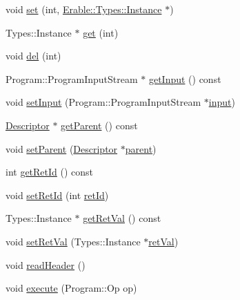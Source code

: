 \begin{DoxyCompactItemize}
void \mbox{\hyperlink{class_erable_1_1_descriptor_ab276c219050350ff23bfaab7ba2a884c}{set}} (int, \mbox{\hyperlink{class_erable_1_1_erable_1_1_types_1_1_instance}{Erable\+::\+Types\+::\+Instance}} $\ast$)
\item 
Types\+::\+Instance $\ast$ \mbox{\hyperlink{class_erable_1_1_descriptor_ac9f9ef44e3eacba39eca916360ced79b}{get}} (int)
\item 
void \mbox{\hyperlink{class_erable_1_1_descriptor_af9b36335f8dcb7b14c80fcd955fc94bc}{del}} (int)
\item 
Program\+::\+Program\+Input\+Stream $\ast$ \mbox{\hyperlink{class_erable_1_1_descriptor_a2d6db09d272799233fc908c566974eae}{get\+Input}} () const
\item 
void \mbox{\hyperlink{class_erable_1_1_descriptor_abc43cc0e7df1c5f70797b50077971d51}{set\+Input}} (Program\+::\+Program\+Input\+Stream $\ast$\mbox{\hyperlink{class_erable_1_1_descriptor_a75e285ecacfb1ac394fe90d178be84c4}{input}})
\item 
\mbox{\hyperlink{class_erable_1_1_descriptor}{Descriptor}} $\ast$ \mbox{\hyperlink{class_erable_1_1_descriptor_ade44929ba23d9f37b653c7c9589b14e0}{get\+Parent}} () const
\item 
void \mbox{\hyperlink{class_erable_1_1_descriptor_a0a5f35c5892712c6087515eb288d710b}{set\+Parent}} (\mbox{\hyperlink{class_erable_1_1_descriptor}{Descriptor}} $\ast$\mbox{\hyperlink{class_erable_1_1_descriptor_ac7d55cb4c5fb036dccc4310a7878ffab}{parent}})
\item 
int \mbox{\hyperlink{class_erable_1_1_descriptor_a735e3ee95355237de05da52dea59e381}{get\+Ret\+Id}} () const
\item 
void \mbox{\hyperlink{class_erable_1_1_descriptor_a0f548ce6b9c0123290548676da72b458}{set\+Ret\+Id}} (int \mbox{\hyperlink{class_erable_1_1_descriptor_ae5ae8353191e79f315d97f5b752c8e3e}{ret\+Id}})
\item 
Types\+::\+Instance $\ast$ \mbox{\hyperlink{class_erable_1_1_descriptor_abee030b1b047c6b81c497ae2211c5320}{get\+Ret\+Val}} () const
\item 
void \mbox{\hyperlink{class_erable_1_1_descriptor_ab54ea4e665991222eb08b4aa4a41f61a}{set\+Ret\+Val}} (Types\+::\+Instance $\ast$\mbox{\hyperlink{class_erable_1_1_descriptor_a1c1bf3943d3d7cbd9776eccba247182f}{ret\+Val}})
\item 
void \mbox{\hyperlink{class_erable_1_1_descriptor_a8aeac23332e1e5d5ad856dd8a6d290e1}{read\+Header}} ()
\item 
void \mbox{\hyperlink{class_erable_1_1_descriptor_a913b6872d839271596bc4a4a70411047}{execute}} (Program\+::\+Op op)

\end{DoxyCompactItemize}
